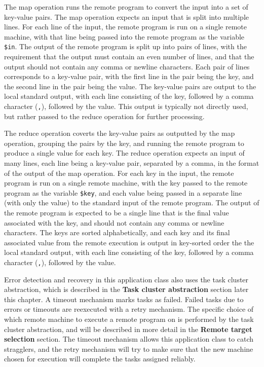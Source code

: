 \documentclass[twoside]{report}
\begin{document}
The map operation runs the remote program to convert the input into a set of key-value pairs.
The map operation expects an input that is split into multiple lines.
For each line of the input, the remote program is run on a single remote machine, with that line being passed into the remote program as the variable \texttt{\$in}.
The output of the remote program is split up into pairs of lines, with the requirement that the output must contain an even number of lines, and that the output should not contain any comma or newline characters.
Each pair of lines corresponds to a key-value pair, with the first line in the pair being the key, and the second line in the pair being the value.
The key-value pairs are output to the local standard output, with each line consisting of the key, followed by a comma character (\texttt{,}), followed by the value.
This output is typically not directly used, but rather passed to the reduce operation for further processing.

The reduce operation coverts the key-value pairs as outputted by the map operation, grouping the pairs by the key, and running the remote program to produce a single value for each key.
The reduce operation expects an input of many lines, each line being a key-value pair, separated by a comma, in the format of the output of the map operation.
For each key in the input, the remote program is run on a single remote machine, with the key passed to the remote program as the variable \texttt{\$key}, and each value being passed in a separate line (with only the value) to the standard input of the remote program.
The output of the remote program is expected to be a single line that is the final value associated with the key, and should not contain any comma or newline characters.
The keys are sorted alphabetically, and each key and its final associated value from the remote execution is output in key-sorted order the the local standard output, with each line consisting of the key, followed by a comma character (\texttt{,}), followed by the value.

Error detection and recovery in this application class also uses the task cluster abstraction, which is described in the \textbf{Task cluster abstraction} section later this chapter.
A timeout mechanism marks tasks as failed.
Failed tasks due to errors or timeouts are reexecuted with a retry mechanism.
The specific choice of which remote machine to execute a remote program on is performed by the task cluster abstraction, and will be described in more detail in the \textbf{Remote target selection} section.
The timeout mechanism allows this application class to catch stragglers, and the retry mechanism will try to make sure that the new machine chosen for execution will complete the tasks assigned reliably.
\end{document}

